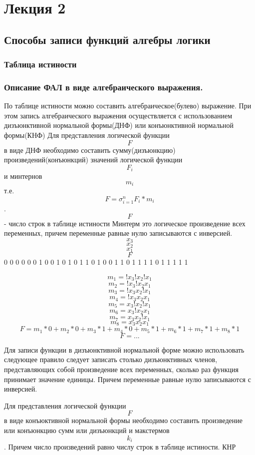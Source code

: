 \documentclass[a4paper]{article}
\begin{document}
    
\section{Лекция 2}
\subsection{Способы записи функций алгебры логики}
\subsubsection{Таблица истиности}
\subsubsection{Описание ФАЛ в виде алгебраического выражения.}
По таблице истиности можно составить алгебраическое(булево) выражение. При этом запись алгебраического выражения осуществляется с использованием дизъюнктивной нормальной формы(ДНФ)
или конъюнктивной нормальной формы(КНФ)
Для представления логической функции $$F$$ в виде ДНФ необходимо составить сумму(дизъюнкцию)
произведений(конъюнкций) значений логической функции $$F_i$$ и минтернов $$m_i$$ т.е.
$$ F = \sigma_{i = 1}^n F_i * m_i $$. $$F$$ - число строк в таблице истиности
Минтерм это логическое произведение всех переменных, причем переменные равные нулю записываются с инверсией.
    $$x_3$$ $$x_2$$ $$x_1$$ $$F$$
    0 0 0 0
    0 0 1 0
    0 1 0 1
    0 1 1 0
    1 0 0 1
    1 0 1 1
    1 1 0 1
    1 1 1 1

$$ m_1 = !x_3!x_2!x_1 $$ 
$$ m_2 = !x_3!x_2x_1  $$
$$ m_3 = !x_3x_2!x_1  $$
$$ m_4 = !x_3x_2x_1  $$
$$ m_5 = x_3!x_2!x_1  $$
$$ m_6 = x_3!x_2x_1  $$
$$ m_7 = x_3x_2!x_1  $$
$$ m_8 = x_3x_2x_1  $$
$$ F = m_1*0 + m_2*0 + m_3*1 + m_4*0 + m_5*1 + m_6*1 + m_7*1 + m_8*1$$
$$ F = ... $$


Для записи функции в дизъюнктивной нормальной форме можно использовать следующее правило
следует записать столько дизъюнктивных членов, представляющих собой произведение всех переменных, сколько раз функция принимает значение единицы. Причем переменные равные нулю записываются с инверсией.


Для представления логической функции $$F$$ в виде конъюктивной нормальной формы необходимо составить произведение или конъюнкцию сумм или дизъюнкций и макстермов $$k_i$$. Причем число произведений равно числу строк в таблице истиности.
КНР
\end{document}

